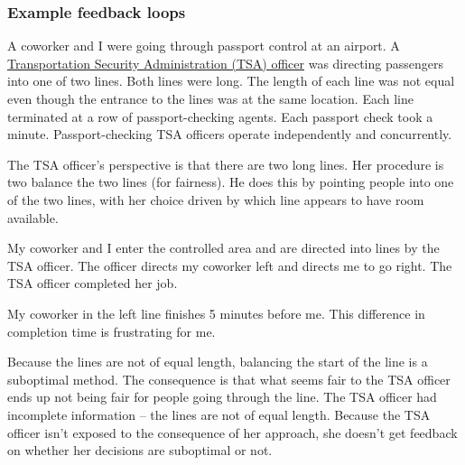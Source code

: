 \subsubsection{Example feedback loops}%
\begin{mdframed}[frametitle={Airport Security Line},frametitlerule=true,frametitlealignment=\centering]
A coworker and I were going through passport control at an airport. 
A \href{https://en.wikipedia.org/wiki/Transportation_Security_Administration}{Transportation Security Administration (TSA) officer} 
was directing passengers into one of two lines. Both lines were long. The length of each line was not equal even though the entrance to the lines was at the same location. Each line terminated at a row of passport-checking agents. Each passport check took a minute. Passport-checking TSA officers operate independently and concurrently.


The TSA officer's perspective is that there are two long lines. Her procedure is two balance the two lines (for fairness). He does this by pointing people into one of the two lines, with her choice driven by which line appears to have room available.

My coworker and I enter the controlled area and are directed into lines by the TSA officer. The officer directs my coworker left and directs me to go right. The TSA officer completed her job.

My coworker in the left line finishes 5 minutes before me. This difference in completion time is frustrating for me.

Because the lines are not of equal length, balancing the start of the line is a suboptimal method. The consequence is that what seems fair to the TSA officer ends up not being fair for people going through the line. The TSA officer had incomplete information -- the lines are not of equal length. Because the TSA officer isn't exposed to the consequence of her approach, she doesn't get feedback on whether her decisions are suboptimal or not.
\end{mdframed}

